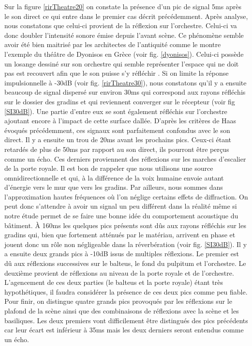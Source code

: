 Sur la figure \ref{rirTheatre20} on constate la présence d'un pic de signal 5ms après le son direct ce qui entre dans le premier cas décrit précédemment. Après analyse, nous constatons que celui-ci provient de la réflexion sur l'orchestre. Celui-ci va donc doubler l'intensité sonore émise depuis l'avant scène. Ce phénomène semble avoir été bien maitrisé par les architectes de l'antiquité comme le montre l'exemple du théâtre de Dyonisos en Grèce (voir fig. \ref{dyonisos}). Celui-ci possède un losange dessiné sur son orchestre qui semble représenter l'espace qui ne doit pas est recouvert afin que le son puisse s'y réfléchir \cite[p.118-120]{canac}. Si on limite la réponse impulsionnelle à -30dB (voir fig. \ref{rirTheatre30}), nous constatons qu'il y a ensuite beaucoup de signal dispersé sur environ 30ms qui correspond aux rayons réfléchis sur le dossier des gradins et qui reviennent converger sur le récepteur (voir fig \ref{SI30dB}). Une partie d'entre eux se sont également réfléchis sur l'orchestre ajoutant encore à l'impact de cette surface dallée. D'après les critères de Haas évoqués précédemment, ces signaux sont parfaitement confondus avec le son direct. Il y a ensuite un trou de 20ms avant les prochains pics. Ceux-ci étant retardés de plus de 50ms par rapport au son direct, ils pourront être perçus comme un écho. Ces derniers proviennent des réflexions sur les marches d'escalier de la porte royale. Il est bon de rappeler que nous utilisons une source omnidirectionnelle et qui, à la différence de la voix humaine envoie autant d'énergie vers le mur que vers les gradins. Par ailleurs, nous sommes dans l'approximation hautes fréquences où l'on néglige certains effets de diffraction. On peut donc s'attendre à avoir un signal un peu différent dans la réalité même si notre étude permet de se faire une bonne idée du comportement acoustique du bâtiment. À 160ms les quelques pics présents sont dûs aux rayons réfléchis sur les gradins qui, bien que fortement atténués par le matériau, arrivent en phase et jouent donc un rôle non négligeable dans la réverbération (voir fig. \ref{SI30dB}). Il y a ensuite deux grands pics à -10dB issus de multiples réflexions. Le premier est dû aux réflexions successives sur le \gls{balteus}, le fond du \gls{pulpitum} et l'orchestre. Le deuxième provient de réflexions au niveau de la porte royale et de l'orchestre. L'agencement de ces deux parties (le \gls{balteus} et la porte royale) étant très hypothétiques, il faudra considérer la présence de ces deux pics comme peu fiable. Pour finir, on distingue quatre grands pics provoqués par les réflexions sur le plafond de la scène ainsi que des combinaisons de réflexions avec la scène et les basiliques. Les deux premiers vont difficilement être distingués des pics précédents car leur écart est inférieur à 35ms mais les deux derniers seront entendus comme un écho.
